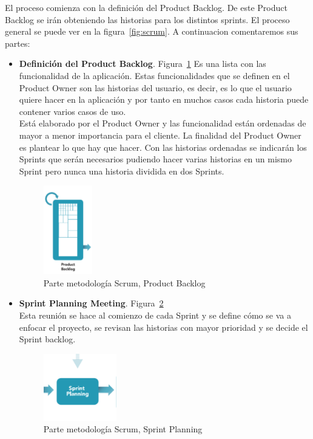 El proceso comienza con la definición del Product Backlog. De este Product Backlog  se irán obteniendo las historias para los distintos sprints. El proceso general se puede ver en la figura~\ref{fig:scrum}. A continuacion comentaremos sus partes:
\begin{itemize}
\item \textbf{Definición del Product Backlog}. Figura~\ref{fig:product}
Es una lista con las funcionalidad de la aplicación.
Estas funcionalidades que se definen en el Product Owner son las historias del usuario, es decir, es lo que el usuario quiere hacer en la aplicación y por tanto en muchos casos cada historia puede contener varios casos de uso. \\
Está elaborado por el Product Owner y las funcionalidad están ordenadas de mayor a menor importancia para el cliente. La finalidad del Product Owner es plantear lo que hay que hacer.
Con las historias ordenadas se indicarán los Sprints que serán necesarios pudiendo hacer  varias historias en un mismo Sprint pero nunca una historia dividida en dos Sprints. 

 
 \begin{figure}
		\centering
		\includegraphics[width=0.2\textwidth] {product.png}
		\caption{Parte metodología Scrum, Product Backlog }\label{fig:product}
	\end{figure} 


\item \textbf{Sprint Planning Meeting}. Figura~\ref{fig:planing}\\
 Esta reunión se hace al comienzo de cada Sprint y se define cómo se va a enfocar el proyecto, se revisan las historias con mayor prioridad y se decide el Sprint backlog.
\begin{figure}[H]
		\centering
		\includegraphics[width=0.3\textwidth] {planing.png}
		\caption{Parte metodología Scrum, Sprint Planning }\label{fig:planing}
	\end{figure} 


\end{itemize}
